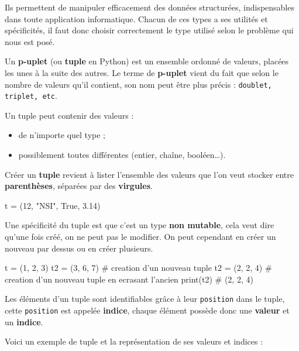 \documentclass[11pt]{article}
\begin{document}
	Ils permettent de manipuler efficacement des données structurées, indispensables dans toute application informatique. Chacun de ces types a ses utilités et spécificités, il faut donc choisir correctement le type utilisé selon le problème qui nous est posé.

	
	
	Un \textbf{p-uplet} (ou \textbf{tuple} en Python) est un ensemble ordonné de valeurs, placées les unes à la
	suite des autres.  Le terme de \textbf{p-uplet} vient du fait que selon le nombre de valeurs qu'il contient, son nom peut être plus précis : \texttt{doublet, triplet, etc}.
	
	Un tuple peut contenir des valeurs :
	\begin{itemize}
		\item de n'importe quel type ;
		\item possiblement toutes différentes (entier, chaîne, booléen…).
	\end{itemize}
	
	
	Créer un \textbf{tuple} revient à lister l'ensemble des valeurs que l'on veut stocker entre \textbf{parenthèses}, séparées par des \textbf{virgules}.
	
	\begin{python}
		t = (12, "NSI", True, 3.14)\end{python}
	
	Une spécificité du tuple est que c'est un type \textbf{non mutable}, cela veut dire qu'une fois créé, on ne peut pas le modifier. On peut cependant en créer un nouveau par dessus ou en créer plusieurs.
	
	\begin{python}
		t = (1, 2, 3)
		t2 = (3, 6, 7)   # creation d'un nouveau tuple
		t2 = (2, 2, 4)   # creation d'un nouveau tuple en ecrasant l'ancien
		print(t2)	# (2, 2, 4)\end{python}
	
	
	Les éléments d'un tuple sont identifiables grâce à leur \texttt{position} dans le tuple, cette \texttt{position} est appelée \textbf{indice}, chaque élément possède donc une \textbf{valeur} et un \textbf{indice}. 
	
	\medskip
	
	Voici un exemple de tuple et la représentation de ses valeurs et indices :
	
\end{document}
